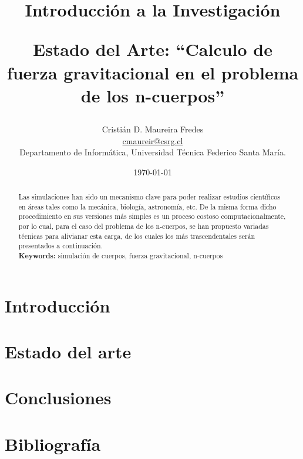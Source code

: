 \documentclass[letter, 10pt]{IEEEtran}
\begin{document}

\pagestyle{empty}

\title{Introducción a la Investigación\\ \begin{Large}Estado del Arte: ``Calculo de fuerza gravitacional en el problema de los n-cuerpos''\end{Large}}
\author{Cristián D. Maureira Fredes\\\url{cmaureir@csrg.cl}\\Departamento de Informática, Universidad Técnica Federico Santa María.}
\date{\today}

\maketitle
\begin{abstract}
Las simulaciones han sido un mecanismo clave para poder realizar estudios científicos
en áreas tales como la mecánica, biología, astronomía, etc. De la misma forma
dicho procedimiento en sus versiones más simples es un proceso costoso
computacionalmente, por lo cual, para el caso del problema de los n-cuerpos,
se han propuesto variadas técnicas para alivianar esta carga, de los cuales
los más trascendentales serán presentados a continuación.\\
{\bf Keywords: } simulación de cuerpos, fuerza gravitacional, n-cuerpos
\end{abstract}

\section{Introducción}
\label{sec:introduccion}


\section{Estado del arte}
\label{sec:estado_arte}


\section{Conclusiones}
\label{sec:conclusiones}


\section{Bibliografía}

\end{document}
